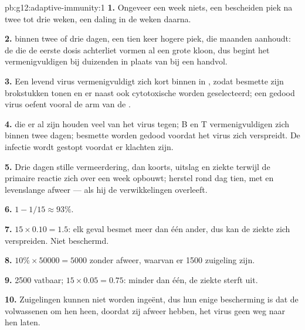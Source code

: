 \begin{solution}{pb:g12:adaptive-immunity:1}
\textbf{1.} Ongeveer een week niets, een bescheiden piek na twee tot drie
weken, een daling in de weken daarna.

\textbf{2.}  binnen twee of drie dagen, een tien keer hogere
piek, die maanden aanhoudt: de  die de eerste dosis
achterliet vormen al een grote kloon, dus begint het vermenigvuldigen bij
duizenden  in plaats van bij een handvol.

\textbf{3.} Een levend virus vermenigvuldigt zich kort binnen in ,
zodat besmette  zijn brokstukken tonen en er naast  ook
cytotoxische  worden geselecteerd; een gedood virus oefent vooral
de arm van de .

\textbf{4.}  die er al zijn houden veel van het virus tegen;
 B en T vermenigvuldigen zich binnen twee dagen; besmette
 worden gedood voordat het virus zich verspreidt. De infectie wordt
gestopt voordat er klachten zijn.

\textbf{5.} Drie dagen stille vermeerdering, dan koorts, uitslag en
ziekte terwijl de primaire reactie zich over een week opbouwt; herstel
rond dag tien, met  en levenslange afweer --- als hij de
verwikkelingen overleeft.

\textbf{6.} $1 - 1/15 \approx 93\%$.

\textbf{7.} $15 \times 0.10 = 1.5$: elk geval besmet meer dan één ander,
dus kan de ziekte zich verspreiden. Niet beschermd.

\textbf{8.} $10\% \times \num{50000} = 5000$ zonder afweer, waarvan er
1500 zuigeling zijn.

\textbf{9.} 2500 vatbaar; $15 \times 0.05 = 0.75$: minder dan één, de
ziekte sterft uit.

\textbf{10.} Zuigelingen kunnen niet worden ingeënt, dus hun enige
bescherming is dat de volwassenen om hen heen, doordat zij afweer hebben,
het virus geen weg naar hen laten.


\end{solution}
